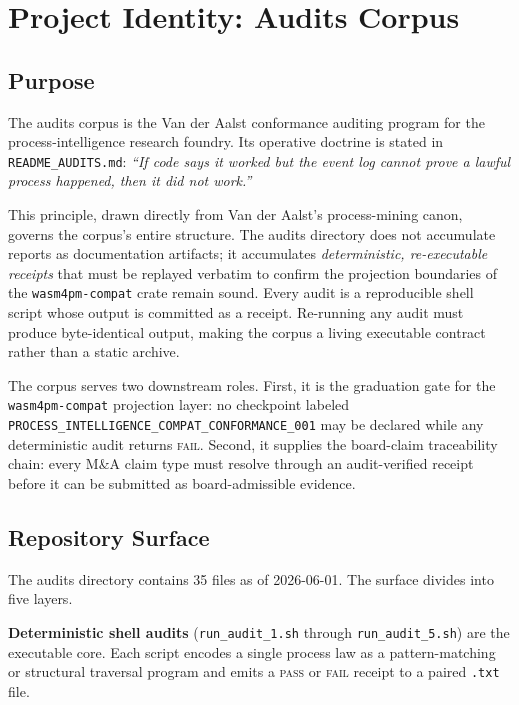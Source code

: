 
\section{Project Identity: Audits Corpus}
\label{sec:audits-identity}

\subsection{Purpose}
\label{sec:audits-identity-purpose}

The audits corpus is the Van der Aalst conformance auditing program for the
process-intelligence research foundry. Its operative doctrine is stated in
\texttt{README\_AUDITS.md}: \emph{``If code says it worked but the event log
cannot prove a lawful process happened, then it did not work.''}

This principle, drawn directly from Van der Aalst's process-mining canon,
governs the corpus's entire structure. The audits directory does not accumulate
reports as documentation artifacts; it accumulates \emph{deterministic,
re-executable receipts} that must be replayed verbatim to confirm the
projection boundaries of the \texttt{wasm4pm-compat} crate remain sound. Every
audit is a reproducible shell script whose output is committed as a receipt.
Re-running any audit must produce byte-identical output, making the corpus a
living executable contract rather than a static archive.

The corpus serves two downstream roles. First, it is the graduation gate for
the \texttt{wasm4pm-compat} projection layer: no checkpoint labeled
\texttt{PROCESS\_INTELLIGENCE\_COMPAT\_CONFORMANCE\_001} may be declared while
any deterministic audit returns \textsc{fail}. Second, it supplies the
board-claim traceability chain: every M\&A claim type must resolve through an
audit-verified receipt before it can be submitted as board-admissible evidence.

\subsection{Repository Surface}
\label{sec:audits-identity-surface}

The audits directory contains 35 files as of 2026-06-01. The surface divides
into five layers.

\textbf{Deterministic shell audits} (\texttt{run\_audit\_1.sh} through
\texttt{run\_audit\_5.sh}) are the executable core. Each script encodes a
single process law as a pattern-matching or structural traversal program and
emits a \textsc{pass} or \textsc{fail} receipt to a paired \texttt{.txt} file.

